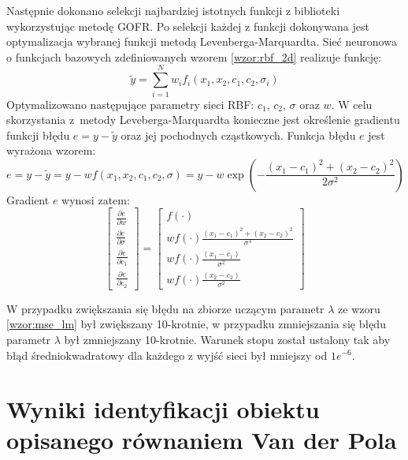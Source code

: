 Następnie dokonano selekcji najbardziej istotnych funkcji z biblioteki wykorzystując metodę GOFR. Po selekcji każdej z funkcji dokonywana jest optymalizacja wybranej funkcji metodą Levenberga-Marquardta. Sieć neuronowa o funkcjach bazowych zdefiniowanych wzorem \eqref{wzor:rbf_2d} realizuje funkcję:
\begin{equation}
	\tilde{y} = \sum_{i=1}^N w_i f_i(x_1,x_2,c_1,c_2,\sigma_i)
\end{equation}
Optymalizowano następujące parametry sieci RBF: $c_1$, $c_2$, $\sigma$ oraz $w$. W celu skorzystania z~metody Leveberga-Marquardta konieczne jest określenie gradientu funkcji błędu $e = y - \tilde{y}$ oraz jej pochodnych cząstkowych. Funkcja błędu $e$ jest wyrażona wzorem:
\begin{equation}
	e = y - \tilde{y} = y - w f(x_1,x_2,c_1,c_2,\sigma) = y - w \exp(-\frac{(x_1-c_1)^2 + (x_2-c_2)^2}{2 \sigma^2}) 
\end{equation}
Gradient $e$ wynosi zatem:
\begin{equation}
\begin{bmatrix}
	\frac{\partial e}{\partial w} \\
	\frac{\partial e}{\partial \sigma} \\
	\frac{\partial e}{\partial c_1} \\
	\frac{\partial e}{\partial c_2}
\end{bmatrix} = 
\begin{bmatrix}
	f(\cdot) \\
	w f(\cdot) \frac{(x_1 - c_1)^2 + (x_2 - c_2)^2}{\sigma^3}\\
	w f(\cdot) \frac{(x_1 - c_1)}{\sigma^2}\\
	w f(\cdot) \frac{(x_2 - c_2)}{\sigma^2}	
\end{bmatrix}
\end{equation}

W przypadku zwiększania się błędu na zbiorze uczącym parametr $\lambda$ ze wzoru \eqref{wzor:mse_lm} był zwiększany 10-krotnie, w przypadku zmniejszania się błędu parametr $\lambda$ był zmniejszany 10-krotnie. Warunek stopu został ustalony tak aby błąd średniokwadratowy dla każdego z wyjść sieci był mniejszy od $1e^{-6}$. 






\clearpage
\section{Wyniki identyfikacji obiektu opisanego równaniem Van der Pola}

